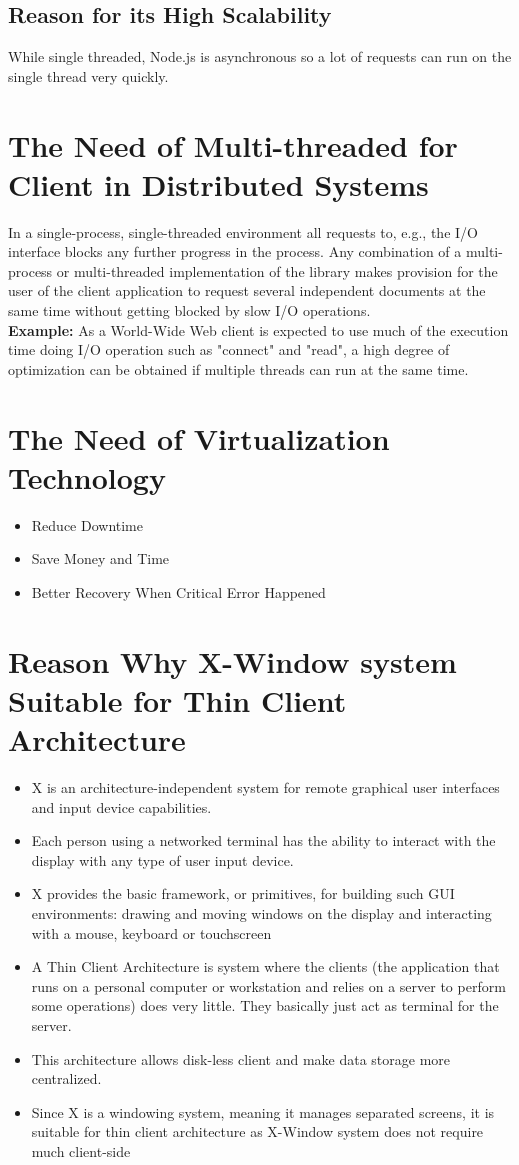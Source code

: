 \documentclass[11pt,a4paper]{report}
\begin{document}
		\subsection{Reason for its High Scalability}
		While single threaded, Node.js is asynchronous so a lot of requests can run on the single thread very quickly.
	\section{The Need of Multi-threaded for Client in Distributed Systems}
	In a single-process, single-threaded environment all requests to, e.g., the I/O interface blocks any further progress in the process. Any combination of a multi-process or multi-threaded implementation of the library makes provision for the user of the client application to request several independent documents at the same time without getting blocked by slow I/O operations.\\
	\textbf{Example:} As a World-Wide Web client is expected to use much of the execution time doing I/O operation such as "connect" and "read", a high degree of optimization can be obtained if multiple threads can run at the same time.
	\section{The Need of Virtualization Technology}
	\begin{itemize}
		\item Reduce Downtime
		\item Save Money and Time
		\item Better Recovery When Critical Error Happened
	\end{itemize}
	\section{Reason Why X-Window system Suitable for Thin Client Architecture}
	\begin{itemize}
		\item X is an architecture-independent system for remote graphical user interfaces and input device capabilities.
		\item Each person using a networked terminal has the ability to interact with the display with any type of user input device.
		\item X provides the basic framework, or primitives, for building such GUI environments: drawing and moving windows on the display and interacting with a mouse, keyboard or touchscreen
		\item A Thin Client Architecture is system where the clients (the application that runs on a personal computer or workstation and relies on a server to perform some operations) does very little. They basically just act as terminal for the server.
		\item This architecture allows disk-less client and make data storage more centralized.
		\item Since X is a windowing system, meaning it manages separated screens, it is suitable for thin client architecture as X-Window system does not require much client-side 
	\end{itemize}
\end{document}
